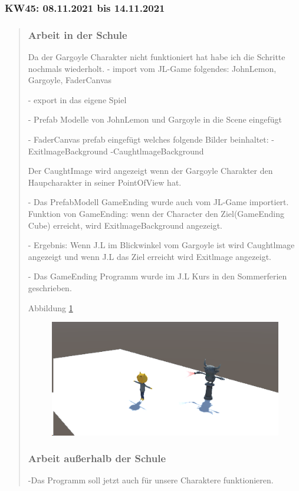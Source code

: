
\subsubsection{KW45: 08.11.2021 bis 14.11.2021}
\begin{quote}
	\subsubsection*{Arbeit in der Schule}
	Da der Gargoyle Charakter nicht funktioniert hat habe ich die Schritte nochmals wiederholt.
	- import vom JL-Game folgendes: JohnLemon, Gargoyle, FaderCanvas
	
	- export in das eigene Spiel
	
	- Prefab Modelle von JohnLemon und Gargoyle in die Scene eingefügt
	
	- FaderCanvas prefab eingefügt welches folgende Bilder beinhaltet:
		-ExitlmageBackground
		-CaughtlmageBackground
		
	  Der CaughtImage wird angezeigt wenn der Gargoyle Charakter den Haupcharakter in seiner PointOfView hat.
	  
	- Das PrefabModell GameEnding wurde auch vom JL-Game importiert.
	  Funktion von GameEnding: wenn der Character den Ziel(GameEnding Cube) erreicht, wird ExitlmageBackground angezeigt.
	  
	- Ergebnis: Wenn J.L im Blickwinkel vom Gargoyle ist wird Caughtlmage angezeigt und wenn J.L das Ziel erreicht wird Exitlmage angezeigt.
	
	- Das GameEnding Programm wurde im J.L Kurs in den Sommerferien geschrieben.
	
	 Abbildung \ref{fig:gameviewsskw45131122}
	  \begin{figure}
	  	\centering
	  	\includegraphics[width=0.5\linewidth]{img/SemihSoenmez_IMG/GameView_SS_KW45_131122}
	  	\caption{}
	  	\label{fig:gameviewsskw45131122}
	  \end{figure}
	\subsubsection*{Arbeit außerhalb der Schule}
	-Das Programm soll jetzt auch für unsere Charaktere funktionieren.
	

\end{quote}
